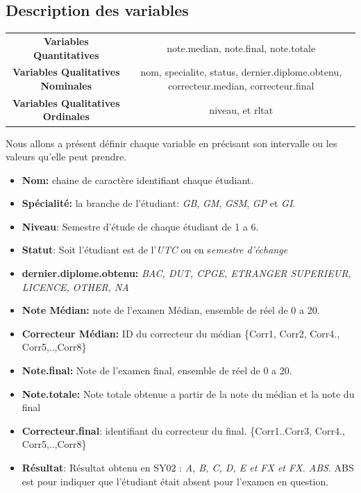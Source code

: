 \documentclass[10pt]{article}
\begin{document}
 \subsection{Description des variables}

\begin{center}
	\begin{tabular}{c c }
		\textbf{Variables Quantitatives} & note.median, note.final, note.totale \\ 
		 \textbf{Variables Qualitatives Nominales} & nom, specialite, status, dernier.diplome.obtenu, correcteur.median, correcteur.final\\
		  \textbf{Variables Qualitatives Ordinales}  & niveau, et rltat  \\
	\end{tabular}
\end{center} 

 Nous allons a présent définir  chaque variable en précisant son intervalle ou les valeurs qu'elle peut prendre.

\begin{itemize}
	\item \textbf{Nom:} chaine de caractère identifiant chaque étudiant.
	\item \textbf{Spécialité:} la branche de l'étudiant: \textit{GB}, \textit{GM}, \textit{GSM}, \textit{GP} et \textit{GI}.
	\item \textbf{Niveau}: Semestre d'étude de chaque étudiant de 1 a 6.
	\item \textbf{Statut}: Soit l'étudiant est de l'\textit{UTC} ou en s\textit{emestre d'échange}
	\item \textbf{dernier.diplome.obtenu:}
	\textit{BAC, DUT, CPGE, ETRANGER SUPERIEUR, LICENCE, OTHER, NA}
	\item \textbf{Note Médian:} note de l'examen Médian, ensemble de réel de 0 a 20.
	\item \textbf{Correcteur Médian:} ID du correcteur du médian \{Corr1, Corr2, Corr4., Corr5,..,Corr8\}
	\item \textbf{Note.final:} Note de l'examen final, ensemble de réel de 0 a 20.
	\item \textbf{Note.totale:} Note totale obtenue a partir de la note du médian et la note du final
	\item \textbf{Correcteur.final}: identifiant  du correcteur du final. \{Corr1..Corr3, Corr4., Corr5,..,Corr8\}
	\item \textbf{Résultat}: Résultat obtenu en SY02 : \textit{A, B, C, D, E et FX et FX. ABS}. ABS est pour indiquer que l'étudiant était absent pour l'examen en question.
\end{itemize}
\end{document}
